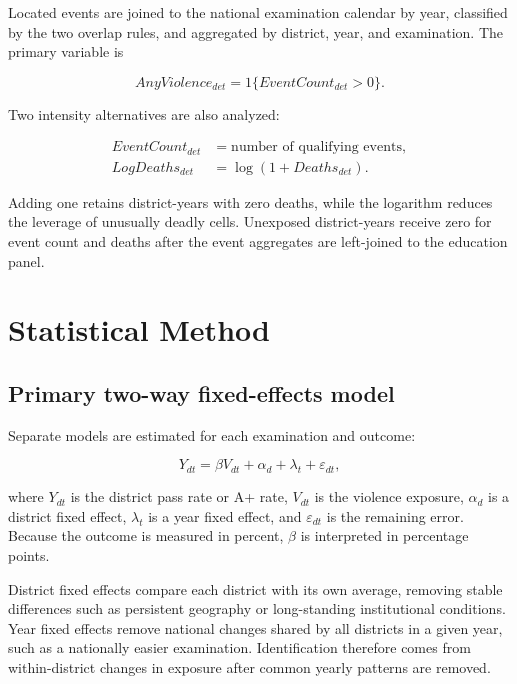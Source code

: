 \documentclass[11pt]{article}
\begin{document}
Located events are joined to the national examination calendar by year, classified by the two overlap rules, and aggregated by district, year, and examination. The primary variable is

\begin{equation}
AnyViolence_{det}=1\{EventCount_{det}>0\}.
\end{equation}

Two intensity alternatives are also analyzed:

\begin{align}
EventCount_{det} &= \text{number of qualifying events},\\
LogDeaths_{det} &= \log(1+Deaths_{det}).
\end{align}

Adding one retains district-years with zero deaths, while the logarithm reduces the leverage of unusually deadly cells. Unexposed district-years receive zero for event count and deaths after the event aggregates are left-joined to the education panel.

\section{Statistical Method}

\subsection{Primary two-way fixed-effects model}

Separate models are estimated for each examination and outcome:

\begin{equation}
Y_{dt}=\beta V_{dt}+\alpha_d+\lambda_t+\varepsilon_{dt},
\label{eq:twfe}
\end{equation}

where $Y_{dt}$ is the district pass rate or A+ rate, $V_{dt}$ is the violence exposure, $\alpha_d$ is a district fixed effect, $\lambda_t$ is a year fixed effect, and $\varepsilon_{dt}$ is the remaining error. Because the outcome is measured in percent, $\beta$ is interpreted in percentage points.

District fixed effects compare each district with its own average, removing stable differences such as persistent geography or long-standing institutional conditions. Year fixed effects remove national changes shared by all districts in a given year, such as a nationally easier examination. Identification therefore comes from within-district changes in exposure after common yearly patterns are removed.
\end{document}
